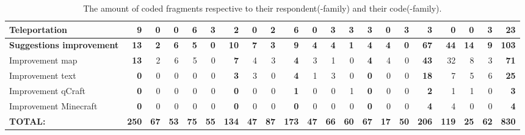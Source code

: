 \documentclass[11pt,twoside]{report} %
\begin{document}
\begin{table}
\begin{tabular}{|p{3cm}|r|r|r|r|r|r|r|r|r|r|r|r|r|r|r|r|r|r|r|r|}
Teleportation & \textbf{9} & 0 & 0 & 6 & 3 & \textbf{2} & 0 & 2 & \textbf{6} & 0 & 3 & 3 & \textbf{3} & 0 & 3 & \textbf{3} & 0 & 0 & 3 & \textbf{23} \\ \hline
\textbf{Suggestions improvement} & \textbf{13} & \textbf{2} & \textbf{6} & \textbf{5} & \textbf{0} & \textbf{10} & \textbf{7} & \textbf{3} & \textbf{9} & \textbf{4} & \textbf{4} & \textbf{1} & \textbf{4} & \textbf{4} & \textbf{0} & \textbf{67} & \textbf{44} & \textbf{14} & \textbf{9} & \textbf{103} \\ \hline
Improvement map & \textbf{13} & 2 & 6 & 5 & 0 & \textbf{7} & 4 & 3 & \textbf{4} & 3 & 1 & 0 & \textbf{4} & 4 & 0 & \textbf{43} & 32 & 8 & 3 & \textbf{71} \\ \hline
Improvement text & \textbf{0} & 0 & 0 & 0 & 0 & \textbf{3} & 3 & 0 & \textbf{4} & 1 & 3 & 0 & \textbf{0} & 0 & 0 & \textbf{18} & 7 & 5 & 6 & \textbf{25} \\ \hline
Improvement qCraft & \textbf{0} & 0 & 0 & 0 & 0 & \textbf{0} & 0 & 0 & \textbf{1} & 0 & 0 & 1 & \textbf{0} & 0 & 0 & \textbf{2} & 1 & 1 & 0 & \textbf{3} \\ \hline
Improvement Minecraft & \textbf{0} & 0 & 0 & 0 & 0 & \textbf{0} & 0 & 0 & \textbf{0} & 0 & 0 & 0 & \textbf{0} & 0 & 0 & \textbf{4} & 4 & 0 & 0 & \textbf{4} \\ \hline
\textbf{TOTAL:} & \textbf{250} & \textbf{67} & \textbf{53} & \textbf{75} & \textbf{55} & \textbf{134} & \textbf{47} & \textbf{87} & \textbf{173} & \textbf{47} & \textbf{66} & \textbf{60} & \textbf{67} & \textbf{17} & \textbf{50} & \textbf{206} & \textbf{119} & \textbf{25} & \textbf{62} & \textbf{830} \\ \hline
\end{tabular}
\caption{The amount of coded fragments respective to their respondent(-family) and their code(-family).\label{tab:codetable}}
\end{table}
\end{document}
